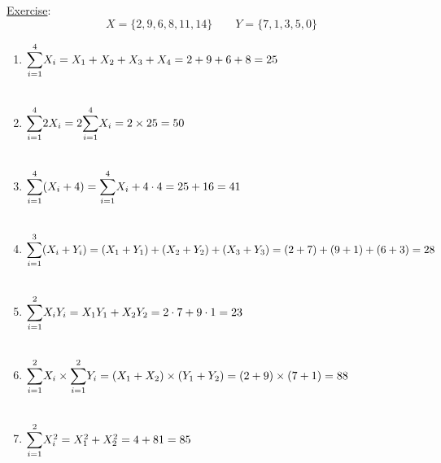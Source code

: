 \documentclass{./../../Latex/handout}
\begin{document}
\underline{Exercise}:
$$ X = \{2,9,6,8,11,14\} \quad \quad Y = \{7,1,3,5,0\}$$ 
\begin{enumerate}
\item $\mathlarger{\sum}_{i=1}^4 X_i = X_1 + X_2 + X_3 + X_4 = 2 + 9 + 6 + 8 = 25 $ \\~\\
\item $\mathlarger{\sum}_{i=1}^4 2 X_i = 2 \mathlarger{\sum}_{i=1}^4 X_i = 2 \times 25 = 50  $ \\~\\
\item $\mathlarger{\sum}_{i=1}^4 (X_i+4) = \mathlarger{\sum}_{i=1}^4 X_i + 4 \cdot 4 = 25+16 = 41 $ \\~\\
\item $\mathlarger{\sum}_{i=1}^3 (X_i+Y_i) = (X_1 + Y_1) + (X_2 + Y_2) + (X_3 + Y_3) = (2+7) + (9+1) + (6+3) = 28 $ \\~\\
\item $\mathlarger{\sum}_{i=1}^2 X_i Y_i = X_1 Y_1 + X_2 Y_2 = 2 \cdot 7 + 9 \cdot 1 = 23  $ \\~\\
\item $\mathlarger{\sum}_{i=1}^2 X_i \times \mathlarger{\sum}_{i=1}^2 Y_i = (X_1+X_2) \times (Y_1 +Y_2) = (2+9) \times (7+1) = 88 $ \\~\\
\item $\mathlarger{\sum}_{i=1}^2 X_i^2 = X_1^2 + X_2^2 = 4 +81 = 85$ \\~\\
\end{enumerate}
\end{document}
